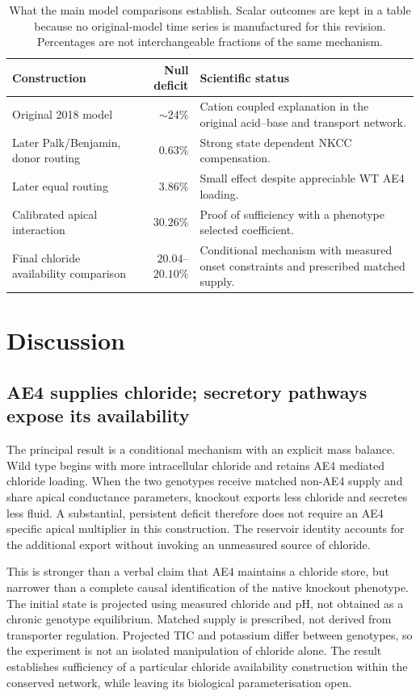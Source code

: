 \documentclass[11pt]{article}
\begin{document}
\begin{table}[t]
\centering
\caption{What the main model comparisons establish. Scalar outcomes are kept in a table because no original-model time series is manufactured for this revision. Percentages are not interchangeable fractions of the same mechanism.}
\label{tab:model-comparison}
\begin{tabularx}{\textwidth}{p{}rX}
\toprule
Construction & Null deficit & Scientific status\\
\midrule
Original 2018 model & $\sim24\%$ & Cation coupled explanation in the original acid--base and transport network.\\
Later Palk/Benjamin, donor routing & $0.63\%$ & Strong state dependent NKCC compensation.\\
Later equal routing & $3.86\%$ & Small effect despite appreciable WT AE4 loading.\\
Calibrated apical interaction & $30.26\%$ & Proof of sufficiency with a phenotype selected coefficient.\\
Final chloride availability comparison & $20.04$--$20.10\%$ & Conditional mechanism with measured onset constraints and prescribed matched supply.\\
\bottomrule
\end{tabularx}
\end{table}

\section{Discussion}
\label{sec:discussion}

\subsection{AE4 supplies chloride; secretory pathways expose its availability}

The principal result is a conditional mechanism with an explicit mass balance. Wild type begins with more intracellular chloride and retains AE4 mediated chloride loading. When the two genotypes receive matched non-AE4 supply and share apical conductance parameters, knockout exports less chloride and secretes less fluid. A substantial, persistent deficit therefore does not require an AE4 specific apical multiplier in this construction. The reservoir identity accounts for the additional export without invoking an unmeasured source of chloride.

This is stronger than a verbal claim that AE4 maintains a chloride store, but narrower than a complete causal identification of the native knockout phenotype. The initial state is projected using measured chloride and pH, not obtained as a chronic genotype equilibrium. Matched supply is prescribed, not derived from transporter regulation. Projected TIC and potassium differ between genotypes, so the experiment is not an isolated manipulation of chloride alone. The result establishes sufficiency of a particular chloride availability construction within the conserved network, while leaving its biological parameterisation open.
\end{document}
